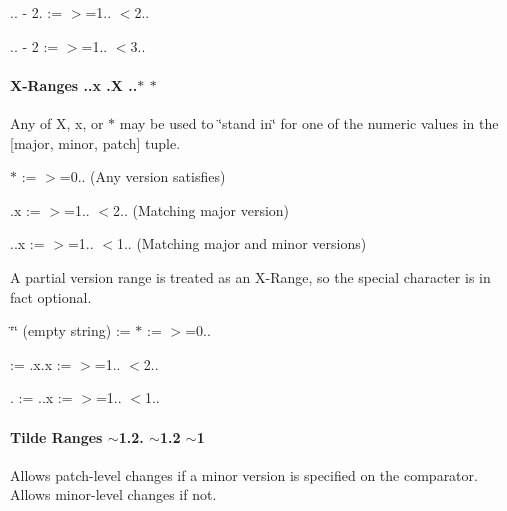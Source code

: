 \begin{DoxyItemize}
\item {.. -\/ 2.} \+:= {\ttfamily $>$=1.. $<$2..}
\item {.. -\/ 2} \+:= {\ttfamily $>$=1.. $<$3..}
\end{DoxyItemize}

\paragraph*{X-\/\+Ranges {..\+x} {.\+X} {..$\ast$} {\ttfamily $\ast$}}

Any of {\ttfamily X}, {\ttfamily x}, or {\ttfamily $\ast$} may be used to \char`\"{}stand in\char`\"{} for one of the numeric values in the {\ttfamily \mbox{[}major, minor, patch\mbox{]}} tuple.


\begin{DoxyItemize}
\item {\ttfamily $\ast$} \+:= {\ttfamily $>$=0..} (Any version satisfies)
\item {.\+x} \+:= {\ttfamily $>$=1.. $<$2..} (Matching major version)
\item {..\+x} \+:= {\ttfamily $>$=1.. $<$1..} (Matching major and minor versions)
\end{DoxyItemize}

A partial version range is treated as an X-\/\+Range, so the special character is in fact optional.


\begin{DoxyItemize}
\item {\ttfamily \char`\"{}\char`\"{}} (empty string) \+:= {\ttfamily $\ast$} \+:= {\ttfamily $>$=0..}
\item {} \+:= {.\+x.\+x} \+:= {\ttfamily $>$=1.. $<$2..}
\item {.} \+:= {..\+x} \+:= {\ttfamily $>$=1.. $<$1..}
\end{DoxyItemize}

\paragraph*{Tilde Ranges {\ttfamily $\sim$1.2.} {\ttfamily $\sim$1.2} {\ttfamily $\sim$1}}

Allows patch-\/level changes if a minor version is specified on the comparator. Allows minor-\/level changes if not.


